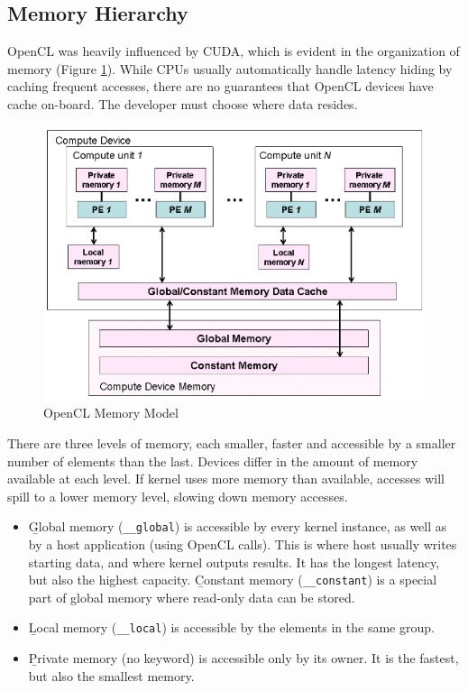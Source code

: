 \subsection{Memory Hierarchy}
OpenCL was heavily influenced by CUDA, which is evident in the organization of memory (Figure \ref{fig:openclmemory}). While CPUs usually automatically handle latency hiding by caching frequent accesses, there are no guarantees that OpenCL devices have cache on-board. The developer must choose where data resides.

\begin{figure}[h]
    \includegraphics[width=\linewidth]{Figures/memory.png}
    \caption{OpenCL Memory Model\cite{munshi2009opencl}}
    \label{fig:openclmemory}
\end{figure}

There are three levels of memory, each smaller, faster and accessible by a smaller number of elements than the last. Devices differ in the amount of memory available at each level. If kernel uses more memory than available, accesses will spill to a lower memory level, slowing down memory accesses.
\begin{itemize}
    \item \b{Global memory} (\texttt{\_\_global}) is accessible by every kernel instance, as well as by a host application (using OpenCL calls). This is where host usually writes starting data, and where kernel outputs results. It has the longest latency, but also the highest capacity. \b{Constant memory} (\texttt{\_\_constant}) is a special part of global memory where read-only data can be stored.
    \item \b{Local memory} (\texttt{\_\_local}) is accessible by the elements in the same group.
    \item \b{Private memory} (no keyword) is accessible only by its owner. It is the fastest, but also the smallest memory.
\end{itemize}

